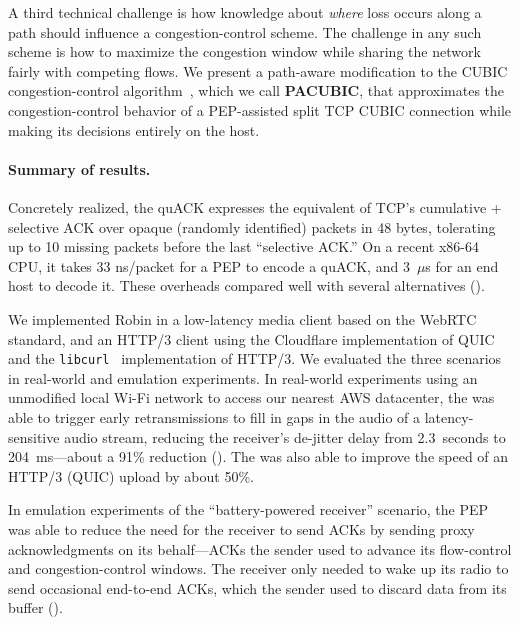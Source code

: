 \smallskip

A third technical challenge is how knowledge about \emph{where}
loss occurs along a path should influence a congestion-control scheme.
The challenge in any such scheme is how to maximize the congestion window
while sharing the network fairly with competing flows.
We present a path-aware modification to the CUBIC congestion-control
algorithm~\cite{ha2008cubic}, which we call \mbox{\textbf{PACUBIC}},
that approximates the congestion-control behavior of a PEP-assisted split TCP
CUBIC connection while making its decisions entirely on the host.

\paragraph{Summary of results.}

Concretely realized, the quACK expresses the equivalent of TCP's
cumulative + selective ACK over opaque (randomly identified) packets
in 48 bytes, tolerating up to 10 missing packets before the last
``selective ACK.'' On a recent x86-64 CPU, it takes 33 ns/packet for a \sys PEP
to encode a quACK, and 3~$\mu$s for an end host to decode it. These
overheads compared
well with several alternatives
().

We implemented Robin in a low-latency media client
based on the WebRTC standard, and an HTTP/3 client using the Cloudflare
implementation of QUIC~\cite{quiche} and the \texttt{libcurl}~\cite{libcurl}
implementation of HTTP/3. We evaluated the three scenarios in
real-world and emulation experiments.
In real-world experiments using an unmodified local Wi-Fi network to access our
nearest AWS datacenter, the \sys was able to trigger early retransmissions
to fill in gaps in the audio of a latency-sensitive audio stream, reducing the
receiver's de-jitter delay from 2.3~seconds to 204~ms---about a 91\% reduction
(). The \sys was also able to improve the speed of an
HTTP/3 (QUIC) upload by about 50\%.

In emulation experiments of the ``battery-powered receiver'' scenario,
the \sys PEP was able to reduce the need for the receiver to send ACKs
by sending proxy acknowledgments on its behalf---ACKs the sender used
to advance its flow-control and congestion-control windows. The
receiver only needed to wake up its radio to send occasional
end-to-end ACKs, which the sender used to discard data from its
buffer ().

